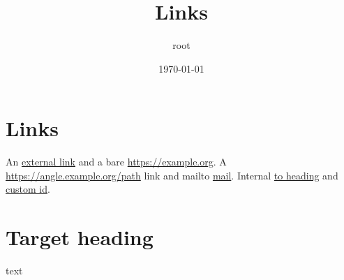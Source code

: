 \documentclass[11pt]{article}
\author{root}
\date{\today}
\title{Links}
\begin{document}
\maketitle
\tableofcontents

\section{Links}
\label{sec:org9372036}
An \href{https://example.org/a\_b?x=1\&y=2\#frag}{external link} and a bare \href{https://example.org}{https://example.org}.
A \url{https://angle.example.org/path} link and mailto \href{mailto:a@b.org}{mail}.
Internal \hyperref[sec:orgd85346d]{to heading} and \hyperref[sec:orgd85346d]{custom id}.
\section{Target heading}
\label{sec:orgd85346d}
text
\end{document}
